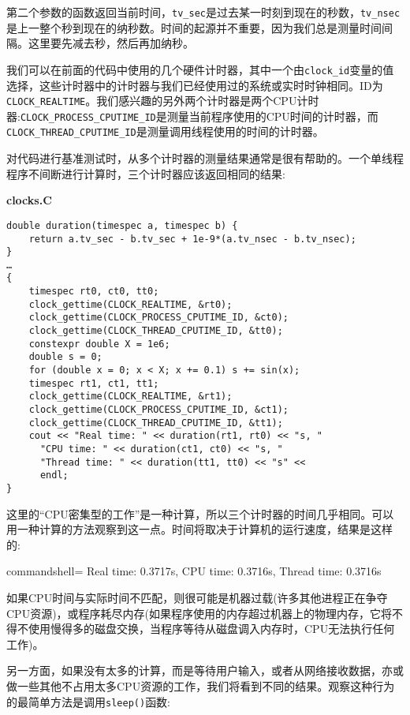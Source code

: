 第二个参数的函数返回当前时间，\texttt{tv\_sec}是过去某一时刻到现在的秒数，\texttt{tv\_nsec}是上一整个秒到现在的纳秒数。时间的起源并不重要，因为我们总是测量时间间隔。这里要先减去秒，然后再加纳秒。

我们可以在前面的代码中使用的几个硬件计时器，其中一个由\texttt{clock\_id}变量的值选择，这些计时器中的计时器与我们已经使用过的系统或实时时钟相同。ID为\texttt{CLOCK\_REALTIME}。我们感兴趣的另外两个计时器是两个CPU计时器:\texttt{CLOCK\_PROCESS\_CPUTIME\_ID}是测量当前程序使用的CPU时间的计时器，而\texttt{CLOCK\_THREAD\_CPUTIME\_ID}是测量调用线程使用的时间的计时器。

对代码进行基准测试时，从多个计时器的测量结果通常是很有帮助的。一个单线程程序不间断进行计算时，三个计时器应该返回相同的结果:

\noindent
\textbf{clocks.C}
\begin{lstlisting}[style=styleCXX]
double duration(timespec a, timespec b) {
	return a.tv_sec - b.tv_sec + 1e-9*(a.tv_nsec - b.tv_nsec);
}
…
{
	timespec rt0, ct0, tt0;
	clock_gettime(CLOCK_REALTIME, &rt0);
	clock_gettime(CLOCK_PROCESS_CPUTIME_ID, &ct0);
	clock_gettime(CLOCK_THREAD_CPUTIME_ID, &tt0);
	constexpr double X = 1e6;
	double s = 0;
	for (double x = 0; x < X; x += 0.1) s += sin(x);
	timespec rt1, ct1, tt1;
	clock_gettime(CLOCK_REALTIME, &rt1);
	clock_gettime(CLOCK_PROCESS_CPUTIME_ID, &ct1);
	clock_gettime(CLOCK_THREAD_CPUTIME_ID, &tt1);
	cout << "Real time: " << duration(rt1, rt0) << "s, "
	  "CPU time: " << duration(ct1, ct0) << "s, "
	  "Thread time: " << duration(tt1, tt0) << "s" <<
	  endl;
}
\end{lstlisting}

这里的“CPU密集型的工作”是一种计算，所以三个计时器的时间几乎相同。可以用一种计算的方法观察到这一点。时间将取决于计算机的运行速度，结果是这样的:

\begin{tcblisting}{commandshell={}}
Real time: 0.3717s, CPU time: 0.3716s, Thread time: 0.3716s
\end{tcblisting}

如果CPU时间与实际时间不匹配，则很可能是机器过载(许多其他进程正在争夺CPU资源)，或程序耗尽内存(如果程序使用的内存超过机器上的物理内存，它将不得不使用慢得多的磁盘交换，当程序等待从磁盘调入内存时，CPU无法执行任何工作)。

另一方面，如果没有太多的计算，而是等待用户输入，或者从网络接收数据，亦或做一些其他不占用太多CPU资源的工作，我们将看到不同的结果。观察这种行为的最简单方法是调用\texttt{sleep()}函数:

